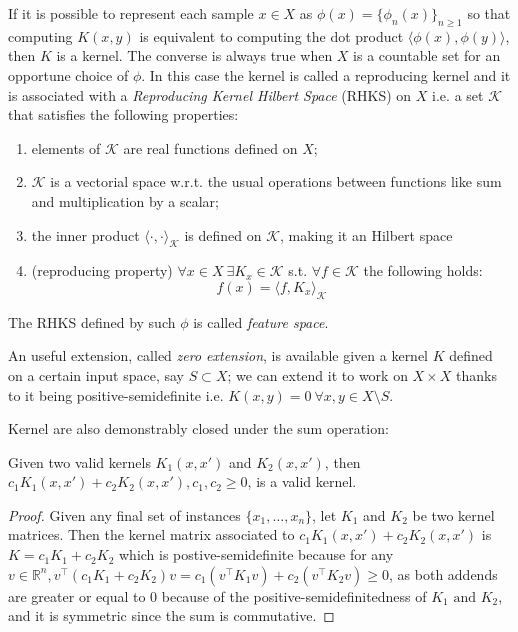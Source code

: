 If it is possible to represent each sample $x \in X$ as $\phi(x) = \{\phi_n(x)\}_{n \geq 1}$
so that computing $K(x,y)$ is equivalent to computing the dot product $\langle
\phi(x),\phi(y)\rangle$, then $K$ is a kernel.
The converse is always true when $X$ is a countable set for an opportune choice
of $\phi$.
In this case the kernel is called a reproducing kernel and it is associated with a \emph{Reproducing
    Kernel Hilbert Space} (RHKS) on $X$ i.e. a set $\mathcal{K}$ that satisfies the following properties:
\begin{enumerate}
    \item elements of $\mathcal{K}$ are real functions defined on $X$;
    \item $\mathcal{K}$ is a vectorial space w.r.t. the usual operations between
    functions like sum and multiplication by a scalar;
    \item the inner product $\langle\cdot,\cdot\rangle_\mathcal{K}$ is 
        defined on $\mathcal{K}$, making it an Hilbert space
    \item (reproducing property) $\forall x \in X~\exists K_x \in \mathcal{K}$
        s.t. $\forall f \in \mathcal{K}$ the following holds:
        \[ f(x) = \langle f,K_x\rangle_\mathcal{K} \]
\end{enumerate}
The RHKS defined by such $\phi$ is called \emph{feature space}.

An useful extension, called \emph{zero extension}, is available given a kernel $K$
defined on a certain input space, say $S\subset X$; we can extend it to work
on $X\times X$ thanks to it being positive-semidefinite i.e.
$K(x,y)=0~\forall x,y \in X\setminus S$.

Kernel are also demonstrably closed under the sum operation:
\begin{theorem}
    Given two valid kernels $K_1(x,x')$ and $K_2(x,x')$, then $c_1K_1(x,x') +
    c_2K_2(x,x'), c_1,c_2 \geq 0$, is a valid kernel.
\end{theorem}
\begin{proof}
    Given any final set of instances $\{x_1,\dots,x_n\}$, let $K_1$ and $K_2$ be
    two kernel matrices. Then the kernel matrix
    associated to $c_1K_1(x,x') + c_2K_2(x,x')$ is $K=c_1K_1+c_2K_2$ which is
    postive-semidefinite because for any $v\in\mathbb{R}^n, v^\top(c_1K_1+c_2K_2)v
    = c_1(v^\top K_1v)+c_2(v^\top K_2v) \geq 0$, as both addends are greater or
    equal to 0 because of the positive-semidefinitedness of $K_1\text{ and }K_2$,
    and it is symmetric since the sum is commutative.
\end{proof}

